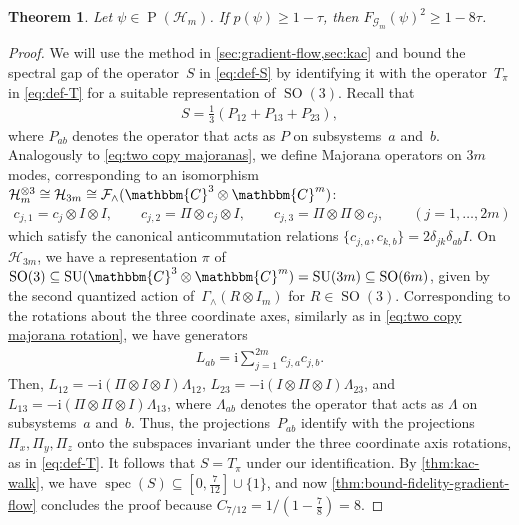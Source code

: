 \documentclass[11pt,a4paper]{article}
\newtheorem{theorem}{Theorem}[section]
\numberwithin{equation}{section}
\newcommand{\ot}{\otimes}
\newcommand{\CC}{\mathbbm{C}}
\newcommand{\HH}{\mathcal{H}}
\newcommand{\id}{I}
\newcommand{\GG}{\mathcal G}
\newcommand{\1}{\mathbf{1}}
\renewcommand{\P}{\operatorname{P}}
\DeclareMathOperator{\SO}{SO}
\DeclareMathOperator{\SU}{SU}
\DeclareMathOperator{\spec}{spec}
\begin{document}
\begin{theorem}\label{thm:main-fermions}
Let $\psi\in\P(\HH_m)$. If $p(\psi) \geq 1 - \tau$, then $F_{\GG_m}(\psi)^2 \geq 1 - 8\tau$.
\end{theorem}
\begin{proof}
We will use the method in \cref{sec:gradient-flow,sec:kac} and bound the spectral gap of the operator~$S$ in \cref{eq:def-S} by identifying it with the operator~$T_\pi$ in \cref{eq:def-T} for a suitable representation of $\SO(3)$.
Recall that
\begin{align*}
    S = \frac13\left(P_{12} + P_{13} + P_{23} \right),
\end{align*}
where $P_{ab}$ denotes the operator that acts as $P$ on subsystems~$a$ and~$b$.
Analogously to \cref{eq:two copy majoranas}, we define Majorana operators on $3m$ modes, corresponding to an isomorphism $\HH_m^{\ot 3} \cong \HH_{3m} \cong \mathcal F_{\wedge}(\CC^3 \ot \CC^m)$:
\begin{align*}
    c_{j,1}=c_j\ot\id\ot\id, \qquad
    c_{j,2}=\Pi\ot c_j\ot\id, \qquad
    c_{j,3}=\Pi\ot\Pi\ot c_j,
    \qquad (j=1,\dots,2m)
\end{align*}
which satisfy the canonical anticommutation relations $\{c_{j,a},c_{k,b}\} =2\delta_{jk}\delta_{ab}\id$.
On $\HH_{3m}$, we have a representation $\pi$ of $\SO(3) \subseteq \SU(\CC^3 \ot \CC^m) = \SU(3m) \subseteq \SO(6m)$, given by the second quantized action of~$\Gamma_{\wedge}(R \ot I_m)$ for $R \in \SO(3)$.
Corresponding to the rotations about the three coordinate axes, similarly as in \cref{eq:two copy majorana rotation}, we have generators
\begin{align*}
    L_{ab} = \mathrm{i} \sum_{j=1}^{2m} c_{j,a} c_{j,b}.
\end{align*}
Then, $L_{12} = - \mathrm{i} (\Pi \ot I \ot I) \Lambda_{12}$, $L_{23} = - \mathrm{i} (I \ot \Pi \ot I) \Lambda_{23}$, and $L_{13} = - \mathrm{i} (\Pi \ot \Pi \ot I) \Lambda_{13}$, where $\Lambda_{ab}$ denotes the operator that acts as $\Lambda$ on subsystems~$a$ and~$b$.
Thus, the projections~$P_{ab}$ identify with the projections~$\Pi_x,\Pi_y,\Pi_z$ onto the subspaces invariant under the three coordinate axis rotations, as in \cref{eq:def-T}.
It follows that $S = T_\pi$ under our identification.
By \cref{thm:kac-walk}, we have $\spec(S) \subseteq [0,\frac{7}{12}] \cup \{1\}$, and now \cref{thm:bound-fidelity-gradient-flow} concludes the proof because $C_{7/12} = 1/(1-\frac78) = 8$.
\end{proof}
\end{document}
